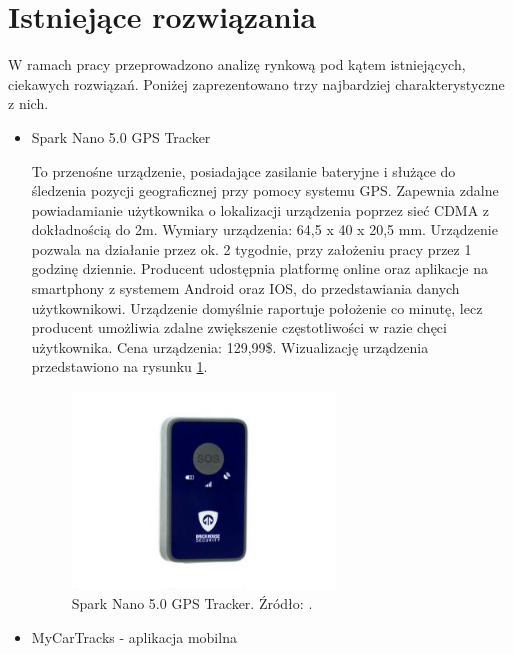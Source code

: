 \section{Istniejące rozwiązania}

W ramach pracy przeprowadzono analizę rynkową pod kątem istniejących, ciekawych rozwiązań. Poniżej zaprezentowano trzy najbardziej charakterystyczne z nich.

\begin{itemize}
\item Spark Nano 5.0 GPS Tracker

To przenośne urządzenie, posiadające zasilanie bateryjne i służące do śledzenia pozycji geograficznej przy pomocy systemu GPS. Zapewnia zdalne powiadamianie użytkownika o lokalizacji urządzenia poprzez sieć CDMA z dokładnością do 2m. Wymiary urządzenia: 64,5 x 40 x 20,5 mm. Urządzenie pozwala na działanie przez ok. 2 tygodnie, przy założeniu pracy przez 1 godzinę dziennie. Producent udostępnia platformę online oraz aplikacje na smartphony z systemem Android oraz IOS, do przedstawiania danych użytkownikowi. Urządzenie domyślnie raportuje położenie co minutę, lecz producent umożliwia zdalne zwiększenie częstotliwości w razie chęci użytkownika. Cena urządzenia: 129,99\$. Wizualizację urządzenia przedstawiono na rysunku \ref{fig:image_spark_nano_tracker}.
\begin{figure}[h]
	\centering
	\includegraphics[width=7cm]{img/introduction/spark_nano.jpg}
	\caption{Spark Nano 5.0 GPS Tracker. Źródło: \cite{spark_nano}.}
	\label{fig:image_spark_nano_tracker}
\end{figure}

\item MyCarTracks - aplikacja mobilna


\end{itemize}
